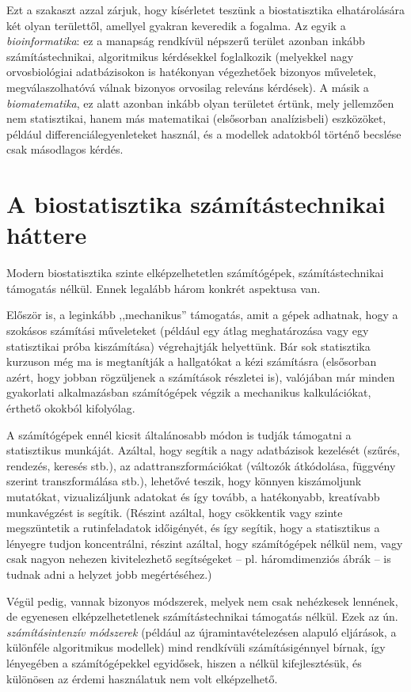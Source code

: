 \documentclass[]{book}
\begin{document}
Ezt a szakaszt azzal zárjuk, hogy kísérletet teszünk a biostatisztika elhatárolására két olyan területtől, amellyel gyakran keveredik a fogalma. Az egyik a \emph{bioinformatika}: ez a manapság rendkívül népszerű terület azonban inkább számítástechnikai, algoritmikus kérdésekkel foglalkozik (melyekkel nagy orvosbiológiai adatbázisokon is hatékonyan végezhetőek bizonyos műveletek, megválaszolhatóvá válnak bizonyos orvosilag releváns kérdések). A másik a \emph{biomatematika}, ez alatt azonban inkább olyan területet értünk, mely jellemzően nem statisztikai, hanem más matematikai (elsősorban analízisbeli) eszközöket, például differenciálegyenleteket használ, és a modellek adatokból történő becslése csak másodlagos kérdés.

\hypertarget{alapokszamtech}{%
\section{A biostatisztika számítástechnikai háttere}\label{alapokszamtech}}

Modern biostatisztika szinte elképzelhetetlen számítógépek, számítástechnikai támogatás nélkül. Ennek legalább három konkrét aspektusa van.

Először is, a leginkább ,,mechanikus'' támogatás, amit a gépek adhatnak, hogy a szokásos számítási műveleteket (például egy átlag meghatározása vagy egy statisztikai próba kiszámítása) végrehajtják helyettünk. Bár sok statisztika kurzuson még ma is megtanítják a hallgatókat a kézi számításra (elsősorban azért, hogy jobban rögzüljenek a számítások részletei is), valójában már minden gyakorlati alkalmazásban számítógépek végzik a mechanikus kalkulációkat, érthető okokból kifolyólag.

A számítógépek ennél kicsit általánosabb módon is tudják támogatni a statisztikus munkáját. Azáltal, hogy segítik a nagy adatbázisok kezelését (szűrés, rendezés, keresés stb.), az adattranszformációkat (változók átkódolása, függvény szerint transzformálása stb.), lehetővé teszik, hogy könnyen kiszámoljunk mutatókat, vizualizáljunk adatokat és így tovább, a hatékonyabb, kreatívabb munkavégzést is segítik. (Részint azáltal, hogy csökkentik vagy szinte megszüntetik a rutinfeladatok időigényét, és így segítik, hogy a statisztikus a lényegre tudjon koncentrálni, részint azáltal, hogy számítógépek nélkül nem, vagy csak nagyon nehezen kivitelezhető segítségeket -- pl. háromdimenziós ábrák -- is tudnak adni a helyzet jobb megértéséhez.)

Végül pedig, vannak bizonyos módszerek, melyek nem csak nehézkesek lennének, de egyenesen elképzelhetetlenek számítástechnikai támogatás nélkül. Ezek az ún. \emph{számításintenzív módszerek} (például az újramintavételezésen alapuló eljárások, a különféle algoritmikus modellek) mind rendkívüli számításigénnyel bírnak, így lényegében a számítógépekkel egyidősek, hiszen a nélkül kifejlesztésük, és különösen az érdemi használatuk nem volt elképzelhető.
\end{document}
